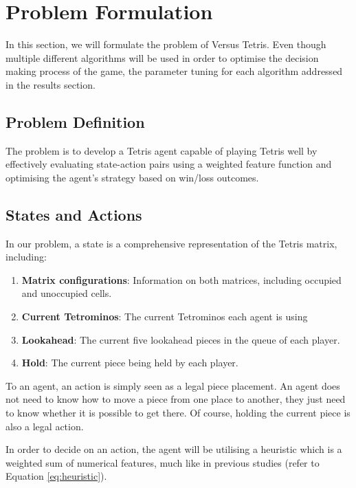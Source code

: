 \documentclass[a4paper, 12pt]{extreport}
\begin{document}
	\section{Problem Formulation}\label{sec:problem-formulation}
	
	In this section, we will formulate the problem of Versus Tetris. Even though multiple different algorithms will be used in order to optimise the decision making process of the game, the parameter tuning for each algorithm addressed in the results section.
	
	\subsection{Problem Definition}
	
	The problem is to develop a Tetris agent capable of playing Tetris well by effectively evaluating state-action pairs using a weighted feature function and optimising the agent's strategy based on win/loss outcomes.
	
	\subsection{States and Actions}
	
	In our problem, a state is a comprehensive representation of the Tetris matrix, including:
	
	\begin{enumerate}
		\item \textbf{Matrix configurations}: Information on both matrices, including occupied and unoccupied cells.
		\item \textbf{Current Tetrominos}: The current Tetrominos each agent is using
		\item \textbf{Lookahead}: The current five lookahead pieces in the queue of each player.
		\item \textbf{Hold}: The current piece being held by each player.
	\end{enumerate}
	
	To an agent, an action is simply seen as a legal piece placement. An agent does not need to know how to move a piece from one place to another, they just need to know whether it is possible to get there. Of course, holding the current piece is also a legal action.
	
	In order to decide on an action, the agent will be utilising a heuristic which is a weighted sum of numerical features, much like in previous studies (refer to Equation \ref{eq:heuristic}).
	
\end{document}
